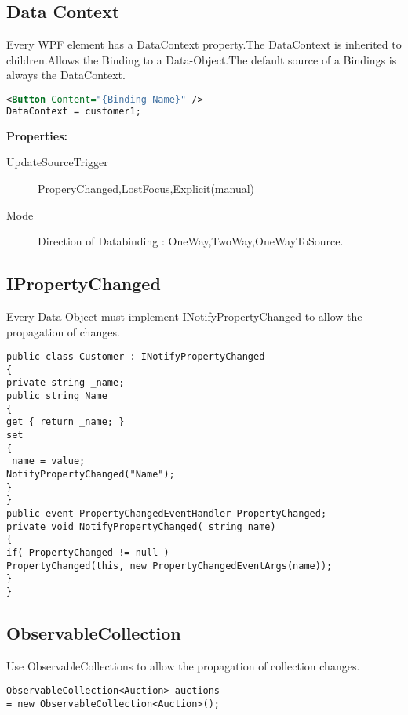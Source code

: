 \documentclass[a4paper,10pt]{scrreprt}
\begin{document}
\subsection{Data Context}
Every WPF element has a DataContext property.The DataContext is inherited to children.Allows the Binding to a Data-Object.The default source of a {Bindings} is always the DataContext.
\begin{lstlisting}[caption=Data Binding Example,language=xml]
<Button Content="{Binding Name}" />
DataContext = customer1;
\end{lstlisting}
\textbf{Properties:}
\begin{description}
\item [UpdateSourceTrigger] ProperyChanged,LostFocus,Explicit(manual)
\item[Mode] Direction of Databinding : OneWay,TwoWay,OneWayToSource.
\end{description}

\subsection{IPropertyChanged}
Every Data-Object must implement INotifyPropertyChanged to allow the propagation of changes.
\begin{lstlisting}[caption=INotifyPropertyChanged implementation]
public class Customer : INotifyPropertyChanged
{
private string _name;
public string Name
{
get { return _name; }
set
{
_name = value;
NotifyPropertyChanged("Name");
}
}
public event PropertyChangedEventHandler PropertyChanged;
private void NotifyPropertyChanged( string name)
{
if( PropertyChanged != null )
PropertyChanged(this, new PropertyChangedEventArgs(name));
}
}
\end{lstlisting}
\subsection{ObservableCollection}
Use ObservableCollections to allow the propagation of collection changes. 
\begin{verbatim}
ObservableCollection<Auction> auctions
= new ObservableCollection<Auction>();
\end{verbatim}
\end{document}
